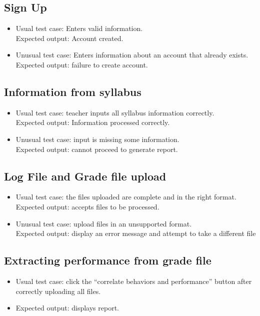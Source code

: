 \documentclass[12pt]{article}
\begin{document}
\subsection{Sign Up}
\begin{itemize}
	\item Usual test case: Enters valid information. \\ Expected output: Account created.
	\item Unusual test case: Enters information about an account that already exists.
		\\ Expected output: failure to create account.
\end{itemize}
\subsection{Information from syllabus}
\begin{itemize}
	\item Usual test case: teacher inputs all syllabus information correctly.\\
		Expected output: Information processed correctly.
	\item Unusual test case: input is missing some information. \\
		Expected output: cannot proceed to generate report.
\end{itemize}
\subsection{Log File and Grade file upload}
\begin{itemize}
	\item Usual test case: the files uploaded are complete and in the right format. \\
		Expected output: accepts files to be processed.
	\item Unusual test case: upload files in an unsupported format.\\
		Expected output: display an error message and attempt to take a different file
\end{itemize}

\subsection{Extracting performance from grade file}
\begin{itemize}
	\item Usual test case: click the “correlate behaviors and performance” button after correctly uploading all files.
	\item Expected output: displays report.
\end{itemize}
\end{document}
